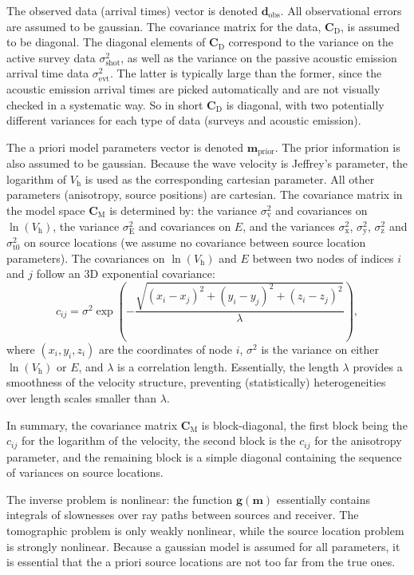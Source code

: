 \documentclass{article}
\renewcommand\vec[1]{\mathbf{#1}}
\newcommand\mat[1]{\mathbf{#1}}
\begin{document}
The observed data (arrival times) vector is denoted $\vec{d}_\mathrm{obs}$. All observational errors are assumed to be gaussian. The covariance matrix for the data, $\mat{C}_\mathrm{D}$, is assumed to be diagonal. The diagonal elements of $\mat{C}_\mathrm{D}$ correspond to the variance on the active survey data $\sigma_\mathrm{shot}^2$, as well as the variance on the passive acoustic emission arrival time data $\sigma_\mathrm{evt}^2$. The latter is typically large than the former, since the acoustic emission arrival times are picked automatically and are not visually checked in a systematic way. So in short $\mat{C}_\mathrm{D}$ is diagonal, with two potentially different variances for each type of data (surveys and acoustic emission).


The a priori model parameters vector is denoted $\vec{m}_\mathrm{prior}$. The prior information is also assumed to be gaussian. Because the wave velocity is Jeffrey's parameter, the logarithm of $V_\mathrm{h}$ is used as the  corresponding cartesian parameter. All other parameters (anisotropy, source positions) are cartesian. The covariance matrix in the model space $\mat{C}_\mathrm{M}$ is determined by: the variance $\sigma_\mathrm{v}^2$ and covariances on $\ln(V_\mathrm{h})$, the variance $\sigma_\mathrm{E}^2$ and covariances on $E$, and the variances $\sigma_\mathrm{x}^2$, $\sigma_\mathrm{y}^2$, $\sigma_\mathrm{z}^2$ and $\sigma_\mathrm{t0}^2$ on source locations (we assume no covariance between source location parameters). The covariances on $\ln(V_\mathrm{h})$ and $E$ between two nodes of indices $i$ and $j$ follow an 3D exponential covariance: 
\begin{equation}
  c_{ij} = \sigma^2 \exp\left(-\frac{\sqrt{(x_i-x_j)^2+(y_i-y_j)^2+(z_i-z_j)^2}}{\lambda}\right),
\end{equation}
where $(x_i,y_i,z_i)$ are the coordinates of node $i$, $\sigma^2$ is the variance on either $\ln(V_\mathrm{h})$ or $E$, and $\lambda$ is a correlation length. Essentially, the length $\lambda$ provides a smoothness of the velocity structure, preventing (statistically) heterogeneities over length scales smaller than $\lambda$.

In summary, the covariance matrix $\mat{C}_\mathrm{M}$ is block-diagonal, the first block being the $c_{ij}$ for the logarithm of the velocity, the second block is the $c_{ij}$ for the anisotropy parameter, and the remaining block is a simple diagonal containing the sequence of variances on source locations.

The inverse problem is nonlinear: the function $\vec{g}(\vec{m})$ essentially contains integrals of slownesses over ray paths between sources and receiver. The tomographic problem is only weakly nonlinear, while the source location problem is strongly nonlinear. Because a gaussian model is assumed for all parameters, it is essential that the a priori source locations are not too far from the true ones.
\end{document}
